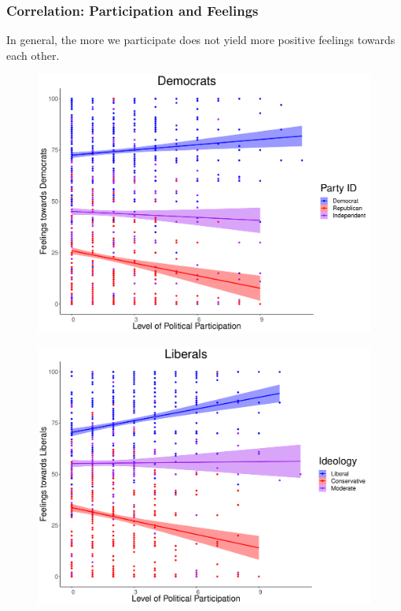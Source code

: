 \documentclass[14pt]{beamer}
\begin{document}
\begin{frame}
\frametitle{Correlation: Participation and Feelings}
\begin{center}
	In general, the more we participate does not yield more positive feelings towards each other.
\end{center}
\end{frame}

\begin{frame}
\begin{center}
	\begin{figure}[ht!]  
		{	 \includegraphics[width=\textwidth]{PFDem}}
	\end{figure}
\end{center}
\end{frame}

\begin{frame}
\begin{center}
\begin{figure}[ht!]  
	{	 \includegraphics[width=\textwidth]{PFLib}}
\end{figure}
\end{center}
\end{frame}
\end{document}
